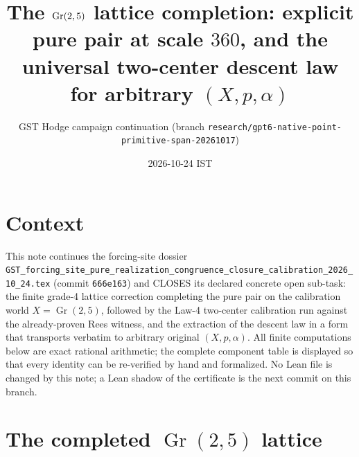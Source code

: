 \documentclass[11pt]{article}
\title{The $\Gr(2,5)$ lattice completion: explicit pure pair at scale $360$,
and the universal two-center descent law for arbitrary $(X,p,\alpha)$}
\author{GST Hodge campaign continuation (branch
\texttt{research/gpt6-native-point-primitive-span-20261017})}
\date{2026-10-24 IST}
\theoremstyle{definition}
\newcommand{\Gr}{\operatorname{Gr}}
\begin{document}
\maketitle

\section*{Context}
This note continues the forcing-site dossier
\texttt{GST\_forcing\_site\_pure\_realization\_congruence\_closure\_calibration\_2026\_10\_24.tex}
(commit \texttt{666e163}) and CLOSES its declared concrete open sub-task:
the finite grade-4 lattice correction completing the pure pair on the
calibration world $X=\Gr(2,5)$, followed by the Law-4 two-center
calibration run against the already-proven Rees witness, and the
extraction of the descent law in a form that transports verbatim to
arbitrary original $(X,p,\alpha)$. All finite computations below are
exact rational arithmetic; the complete component table is displayed so
that every identity can be re-verified by hand and formalized. No Lean
file is changed by this note; a Lean shadow of the certificate is the
next commit on this branch.

\section{The completed $\Gr(2,5)$ lattice}
\end{document}
